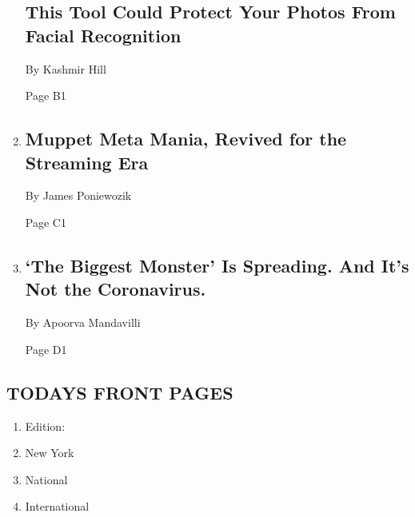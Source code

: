 \begin{enumerate}
  \hypertarget{this-tool-could-protect-your-photos-from-facial-recognition}{%
  \subsection{This Tool Could Protect Your Photos From Facial
  Recognition}\label{this-tool-could-protect-your-photos-from-facial-recognition}}

  By Kashmir Hill

  Page B1
\item
  \href{/2020/07/31/arts/television/muppets-now.html}{}

  \hypertarget{muppet-meta-mania-revived-for-the-streaming-era}{%
  \subsection{Muppet Meta Mania, Revived for the Streaming
  Era}\label{muppet-meta-mania-revived-for-the-streaming-era}}

  By James Poniewozik

  Page C1
\item
  \href{/2020/08/03/health/coronavirus-tuberculosis-aids-malaria.html}{}

  \hypertarget{the-biggest-monster-is-spreading-and-its-not-the-coronavirus}{%
  \subsection{`The Biggest Monster' Is Spreading. And It's Not the
  Coronavirus.}\label{the-biggest-monster-is-spreading-and-its-not-the-coronavirus}}

  By Apoorva Mandavilli

  Page D1
\end{enumerate}

\hypertarget{todays-front-pages}{%
\subsection{TODAYS FRONT PAGES}\label{todays-front-pages}}

\begin{enumerate}
\def\labelenumi{\arabic{enumi}.}
\tightlist
\item
  Edition:
\item
  New York
\item
  National
\item
  International
\end{enumerate}

\href{http://app.nytimes.com/todayspaper}{}

